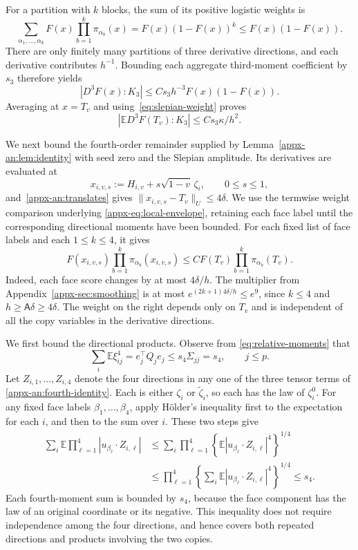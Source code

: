 \documentclass[11pt,letterpaper]{article}
\theoremstyle{remark}
\newcommand{\E}{\mathbb E}
\begin{document}
For a partition with \(k\) blocks, the sum of its positive logistic
weights is
\[
 \sum_{\alpha_1,\ldots,\alpha_k}
       F(x)\prod_{b=1}^k\pi_{\alpha_b}(x)
 =F(x)(1-F(x))^k
 \le F(x)(1-F(x)).
\]
There are only finitely many partitions of three derivative
directions, and each derivative contributes \(h^{-1}\).
Bounding each aggregate third-moment coefficient by \(s_3\)
therefore yields
\[
 |D^3F(x):K_3|\le Cs_3h^{-3}F(x)(1-F(x)).
\]
Averaging at \(x=T_v\) and using~\eqref{eq:slepian-weight} proves
\[
 |\E D^3F(T_v):K_3|\le Cs_3\kappa/h^2.
\]

We next bound the fourth-order remainder supplied by
Lemma~\ref{appx-an:lem:identity} with seed zero and the Slepian
amplitude. Its derivatives are evaluated at
\[
 x_{i,v,s}:=H_{i,v}+s\sqrt{1-v}\,\zeta_i,\qquad 0\le s\le1,
\]
and~\eqref{appx-an:translates} gives
\(\|x_{i,v,s}-T_v\|_U\le4\delta\).
We use the termwise weight comparison underlying
\eqref{appx-eq:local-envelope}, retaining each face label until
the corresponding directional moments have been bounded.
For each fixed list of face labels and each $1\le k\le4$, it gives
\[
 F(x_{i,v,s})\prod_{b=1}^k\pi_{\alpha_b}(x_{i,v,s})
 \le C F(T_v)\prod_{b=1}^k\pi_{\alpha_b}(T_v).
\]
Indeed, each face score changes by at most $4\delta/h$. The
multiplier from Appendix~\ref{appx-sec:smoothing} is at most
$e^{(2k+1)4\delta/h}\le e^9$, since $k\le4$ and
$h\ge\mathsf A\delta\ge4\delta$.
The weight on the right depends only on \(T_v\) and is
independent of all the copy variables in the derivative directions.

We first bound the directional products. Observe from
\eqref{eq:relative-moments} that
\[
 \sum_i\E\xi_{ij}^4=e_j^\top Q_j e_j
 \le s_4\Sigma_{jj}=s_4,\qquad j\le p.
\]
Let \(Z_{i,1},\ldots,Z_{i,4}\) denote the four directions in any
one of the three tensor terms of
\eqref{appx-an:fourth-identity}. Each is either \(\zeta_i\) or
\(\widetilde\zeta_i\), so each has the law of \(\zeta_i^0\).
For any fixed face labels $\beta_1,\ldots,\beta_4$, apply
H\"older's inequality first to the expectation for each $i$,
and then to the sum over $i$. These two steps give
\[
 \begin{aligned}
 \sum_i\E\prod_{\ell=1}^4
       |u_{\beta_\ell}\cdot Z_{i,\ell}|
 &\le\sum_i\prod_{\ell=1}^4
       \left\{\E
         |u_{\beta_\ell}\cdot Z_{i,\ell}|^4\right\}^{1/4}\\
 &\le\prod_{\ell=1}^4
       \left\{\sum_i\E
         |u_{\beta_\ell}\cdot Z_{i,\ell}|^4\right\}^{1/4}
 \le s_4.
 \end{aligned}
\]
Each fourth-moment sum is bounded by $s_4$, because the face
component has the law of an original coordinate or its negative.
This inequality does not require independence among the four
directions, and hence covers both repeated directions and products
involving the two copies.
\end{document}
